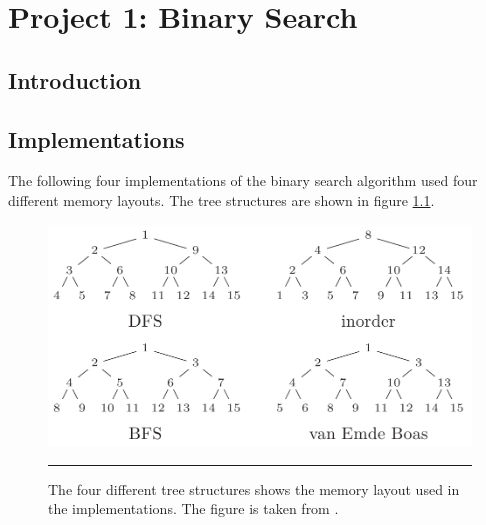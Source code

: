 
\chapter{Project 1: Binary Search} %

\label{Chapter1} %



\section{Introduction}



\section{Implementations}
The following four implementations of the binary search algorithm used four different memory layouts. The tree structures are shown in figure \ref{fig:memory_layouts}.

\begin{figure}[htbp]
	\centering
		\includegraphics[width=\textwidth]{./Figures/Project1/MemoryLayouts.png}
		\rule{35em}{0.5pt}
	\caption[Memory layouts]{
	The four different tree structures shows the memory layout used in the implementations. The figure is taken from \citep{binAlg}.
	}
	\label{fig:memory_layouts}
\end{figure}



